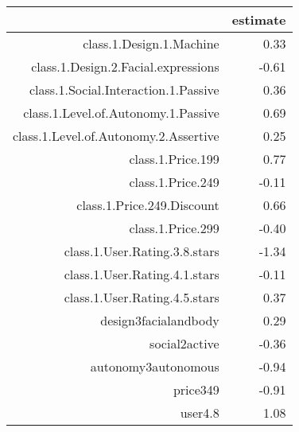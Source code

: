 \begin{table}[ht]
\centering
\begin{tabular}{rr}
  \hline
 & estimate \\ 
  \hline
class.1.Design.1.Machine & 0.33 \\ 
  class.1.Design.2.Facial.expressions & -0.61 \\ 
  class.1.Social.Interaction.1.Passive & 0.36 \\ 
  class.1.Level.of.Autonomy.1.Passive & 0.69 \\ 
  class.1.Level.of.Autonomy.2.Assertive & 0.25 \\ 
  class.1.Price.199 & 0.77 \\ 
  class.1.Price.249 & -0.11 \\ 
  class.1.Price.249.Discount & 0.66 \\ 
  class.1.Price.299 & -0.40 \\ 
  class.1.User.Rating.3.8.stars & -1.34 \\ 
  class.1.User.Rating.4.1.stars & -0.11 \\ 
  class.1.User.Rating.4.5.stars & 0.37 \\ 
  design3facialandbody & 0.29 \\ 
  social2active & -0.36 \\ 
  autonomy3autonomous & -0.94 \\ 
  price349 & -0.91 \\ 
  user4.8 & 1.08 \\ 
   \hline
\end{tabular}
\end{table}
